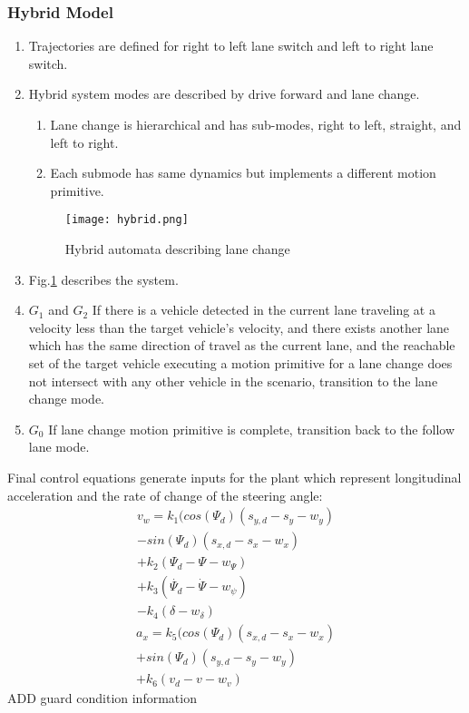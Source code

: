 \subsubsection{Hybrid Model}
\label{caseStudyHybridModel}
	\begin{enumerate}
	\item Trajectories are defined for right to left lane switch and left to right lane switch.
	\item Hybrid system modes are described by drive forward and lane change.
	\begin{enumerate}
		\item Lane change is hierarchical and has sub-modes, right to left, straight, and left to right.
		\item Each submode has same dynamics but implements a different motion primitive.
	\end{enumerate}

		\begin{figure}[tb]
			\label{fig:hybrid}
			\centering
			\texttt{[image: hybrid.png]}
			\caption{Hybrid automata describing lane change}
		\end{figure}
	\item Fig.\ref{fig:hybrid} describes the system.
	\item[] \(G_1\) and \(G_2\) If there is a vehicle detected in the current lane traveling at a velocity less than the target vehicle's velocity, and there exists another lane which has the same direction of travel as the current lane, and the reachable set of the target vehicle executing a motion primitive for a lane change does not intersect with any other vehicle in the scenario, transition to the lane change mode.
	\item[] \(G_0\) If lane change motion primitive is complete, transition back to the follow lane mode.
		\end{enumerate}
		
Final control equations generate inputs for the plant which represent longitudinal acceleration and the rate of change of the steering angle:
\begin{equation}
\begin{aligned}
v_w=k_1(cos{(\Psi_d)}(s_{y,d}-s_y-w_y)\\
-sin{(\Psi_d)}(s_{x,d}-s_x-w_x)\\ 
+k_2(\Psi_d-\Psi-w_{\Psi}) \\
+k_3(\dot{\Psi_d} -\dot{\Psi}-w_{\psi})\\
-k_4(\delta-w_{\delta})
\end{aligned}
\end{equation}
\begin{equation}
\begin{aligned}
a_x=k_5(cos{(\Psi_d)}(s_{x,d}-s_x-w_x)\\
+sin{(\Psi_d)}(s_{y,d}-s_y-w_y)\\
+k_6(v_d-v-w_v)
\end{aligned}
\end{equation}
ADD guard condition information